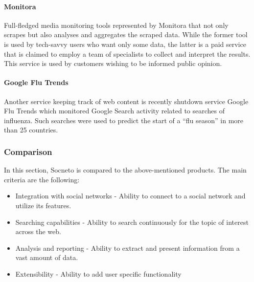 

\paragraph{Monitora}

Full-fledged media monitoring tools represented by Monitora that not only scrapes but also analyses and aggregates the scraped data. While the former tool is used by tech-savvy users who want only some data, the latter is a paid service that is claimed to employ a team of specialists to collect and interpret the results. This service is used by customers wishing to be informed public opinion.

\paragraph{Google Flu Trends}

Another service keeping track of web content is recently shutdown service Google Flu Trends which monitored Google Search activity related to searches of influenza. Such searches were used to predict the start of a ``flu season'' in more than 25 countries. 

\subsubsection{Comparison}

In this section, Socneto is compared to the above-mentioned products. The main criteria are the following:

\begin{itemize}
    \item Integration with social networks - Ability to connect to a social network and utilize its features.
    \item Searching capabilities - Ability to search continuously for the topic of interest across the web.
    \item Analysis and reporting - Ability to extract and present information from a vast amount of data.
    \item Extensibility - Ability to add user specific functionality
\end{itemize}

